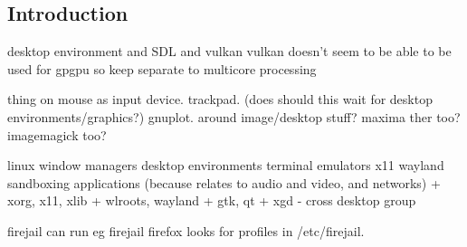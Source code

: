 
\subsection{Introduction}

desktop environment and SDL and vulkan
vulkan doesn't seem to be able to be used for gpgpu so keep separate to multicore processing

thing on mouse as input device. trackpad. (does should this wait for desktop environments/graphics?)
gnuplot. around image/desktop stuff? maxima ther too? imagemagick too?


linux window managers
desktop environments
terminal emulators
x11
wayland
sandboxing applications (because relates to audio and video, and networks)
+ xorg, x11, xlib
+ wlroots, wayland
+ gtk, qt
+ xgd - cross desktop group


firejail
can run eg
firejail firefox
looks for profiles in /etc/firejail.


